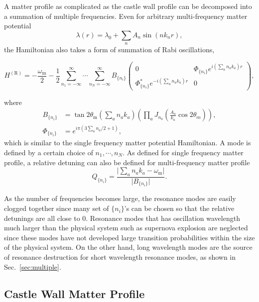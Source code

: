\documentclass[%
reprint,
 amsmath,amssymb,
 prd,
]{revtex4-1}
\begin{document}
A matter profile as complicated as the castle wall profile can be decomposed into a summation of multiple frequencies. Even for arbitrary multi-frequency matter potential
\begin{equation}
    \lambda(r) = \lambda_0 + \sum_n A_n \sin (n k_n r),
\end{equation}
the Hamiltonian also takes a form of summation of Rabi oscillations,
\begin{widetext}
\begin{equation}
    H^{(\mathrm R)} = -\frac{\omega_{\mathrm m}}{2} - \frac{1}{2} \sum_{n_1=-\infty}^\infty \cdots \sum_{n_N = -\infty}^\infty B_{\{n_i\}} 
    \begin{pmatrix}
    0 & \Phi_{\{n_i\}} e^{i\left( \sum_a n_a k_a \right)r} \\
    \Phi_{\{n_i\}}^* e^{-i\left( \sum_a n_a k_a \right)r} & 0
    \end{pmatrix},
\end{equation}
\end{widetext}
where
\begin{align*}
    B_{\{n_i\}} &=  \tan 2\theta_{\mathrm m} \left( \sum_a n_a k_a \right) \left( \prod_a J_{n_a}\left( \frac{A_a}{k_a}\cos 2\theta_m \right) \right),\\
    \Phi_{\{n_i\}} &= e^{i\pi (3\sum_a n_a/2+1)},
\end{align*}
which is similar to the single frequency matter potential Hamiltonian. A mode is defined by a certain choice of $n_1,\cdots,n_N$. As defined for single frequency matter profile, a relative detuning can also be defined for multi-frequency matter profile
\begin{equation}
    Q_{\{n_i\}} = \frac{\lvert \sum_a n_a k_a - \omega_{\mathrm m} \rvert }{\lvert B_{\{n_i\}} \rvert}.
\end{equation}

As the number of frequencies becomes large, the resonance modes are easily clogged together since many set of $\{n_i\}$'s can be chosen so that the relative detunings are all close to 0. Resonance modes that has oscillation wavelength much larger than the physical system such as supernova explosion are neglected since these modes have not developed large transition probabilities within the size of the physical system. On the other hand, long wavelength modes are the source of resonance destruction for short wavelength resonance modes, as shown in Sec.~\ref{sec:multiple}.




\subsection{Castle Wall Matter Profile}
\end{document}
